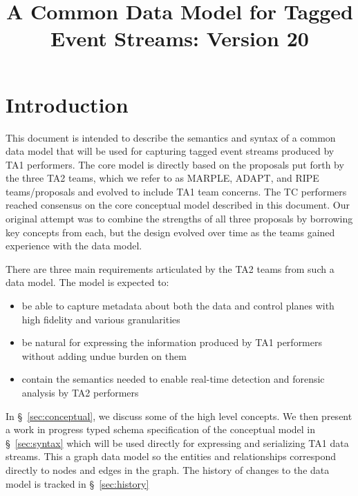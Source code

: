\documentclass[10pt, conference, onecolumn]{IEEEtran}
\begin{document}
\title{A Common Data Model for Tagged Event Streams: Version 20}
\maketitle

\section{Introduction}

This document is intended to describe the semantics and syntax of a
common data model that will be used for capturing tagged event streams
produced by TA1 performers. The core model is directly based on the
proposals put forth by the three TA2 teams, which we refer to as
MARPLE, ADAPT, and RIPE teams/proposals and evolved to include TA1
team concerns. The TC performers reached consensus on the core
conceptual model described in this document. Our original attempt was
to combine the strengths of all three proposals by borrowing key
concepts from each, but the design evolved over time as the teams
gained experience with the data model.

There are three main requirements articulated by the
TA2 teams from such a data model. The model is expected to:

\begin{itemize}

  \item be able to capture metadata about both the data and control
    planes with high fidelity and various granularities

  \item be natural for expressing the information produced by TA1
    performers without adding undue burden on them

  \item contain the semantics needed to enable real-time detection and
    forensic analysis by TA2 performers

\end{itemize}

In \S~\ref{sec:conceptual}, we discuss some of the high level
concepts. We then present a work in progress typed schema
specification of the conceptual model in \S~\ref{sec:syntax} which
will be used directly for expressing and serializing TA1 data streams.
This a graph data model so the entities and relationships correspond
directly to nodes and edges in the graph. The history of changes to the data model is tracked in \S~\ref{sec:history}
\end{document}
